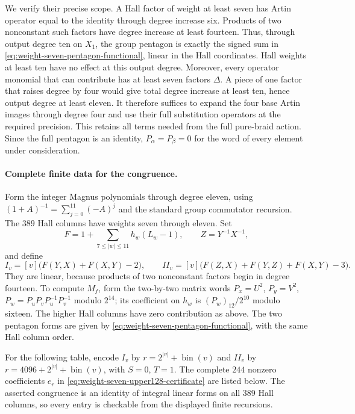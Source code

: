We verify their precise scope. A Hall factor of weight at least
seven has Artin operator equal to the identity through degree
increase six. Products of two nonconstant such factors have
degree increase at least fourteen. Thus, through output degree
ten on $X_1$, the group pentagon is exactly the signed sum in
\eqref{eq:weight-seven-pentagon-functional}, linear in the Hall
coordinates. Hall weights at least ten have no effect at this
output degree. Moreover, every operator monomial that can contribute
has at least seven factors $\Delta$. A piece of one factor that
raises degree by four would give total degree increase at least
ten, hence output degree at least eleven. It therefore suffices
to expand the four base Artin images through degree four and use
their full substitution operators at the required precision.
This retains all terms needed from the full pure-braid action.
Since the full pentagon is an identity, $P_\alpha=P_\beta=0$
for the word of every element under consideration.

\paragraph{Complete finite data for the congruence.}
Form the integer Magnus polynomials through degree eleven, using
$(1+A)^{-1}=\sum_{j=0}^{11}(-A)^j$ and the standard group
commutator recursion. The $389$ Hall columns have weights seven
through eleven. Set
\[
 F=1+\sum_{7\le |w|\le11}h_w(L_w-1),\qquad Z=Y^{-1}X^{-1},
\]
and define
\[
 I_v=[v]\bigl(F(Y,X)+F(X,Y)-2\bigr),\qquad
 II_v=[v]\bigl(F(Z,X)+F(Y,Z)+F(X,Y)-3\bigr).
\]
They are linear, because products of two nonconstant factors begin
in degree fourteen. To compute $M_f$, form the two-by-two matrix
words $P_x=U^2$, $P_y=V^2$,
$P_w=P_uP_vP_u^{-1}P_v^{-1}$ modulo $2^{14}$; its coefficient on
$h_w$ is $(P_w)_{12}/2^{10}$ modulo sixteen. The higher Hall
columns have zero contribution as above. The two pentagon forms
are given by \eqref{eq:weight-seven-pentagon-functional}, with
the same Hall column order.

For the following table, encode $I_v$ by
$r=2^{|v|}+\operatorname{bin}(v)$ and $II_v$ by
$r=4096+2^{|v|}+\operatorname{bin}(v)$, with $S=0$, $T=1$.
The complete $244$ nonzero coefficients $e_r$ in
\eqref{eq:weight-seven-upper128-certificate} are listed below.
The asserted congruence is an identity of integral linear forms
on all $389$ Hall columns, so every entry is checkable from the
displayed finite recursions.


